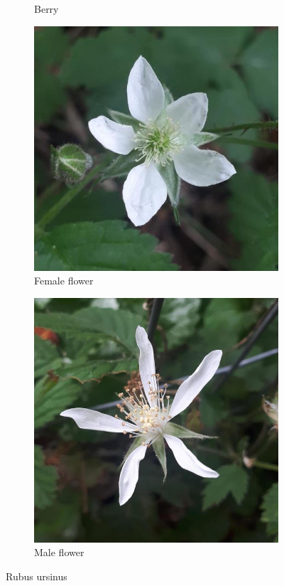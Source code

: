 \begin{figure}
\begin{subfigure}{0.47\textwidth}
    \caption{Berry}
    \label{fig:rub:ursinus:berry}
\end{subfigure}
\hfill
\begin{subfigure}{0.47\textwidth}
    \includegraphics[width=\textwidth]{rubus/ursinus_flower_female_01}
    \caption{Female flower}
    \label{fig:rub:ursinus:flower:female}
\end{subfigure}
\hfill
\begin{subfigure}{0.47\textwidth}
    \includegraphics[width=\textwidth]{rubus/ursinus_flower_male_02}
    \caption{Male flower}
    \label{fig:rub:ursinus:flower:male}
\end{subfigure}
        
\caption{Rubus ursinus}
\label{fig:rub:ursinus}
\end{figure}

